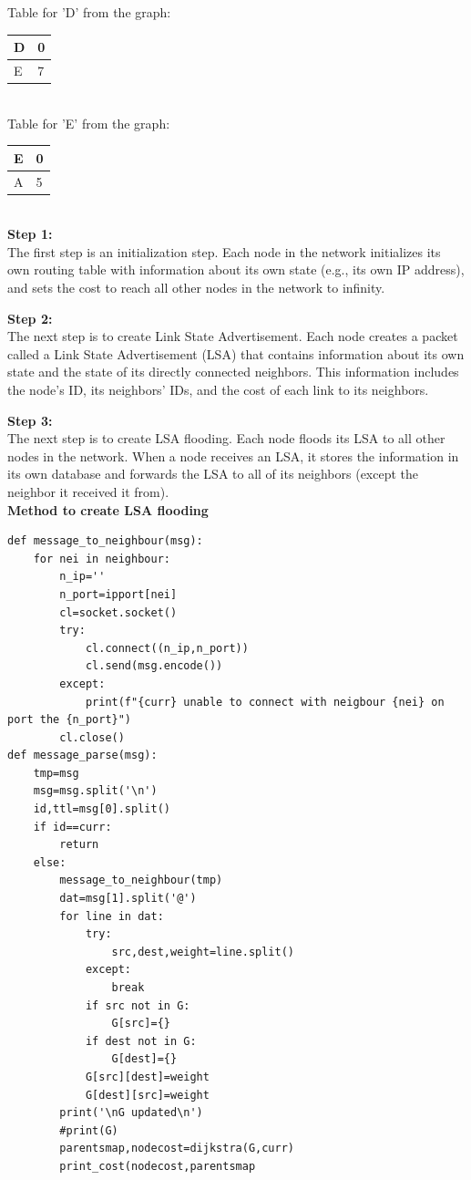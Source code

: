 \documentclass[11pt]{article}
\begin{document}
Table for 'D' from the graph:\\[12pt] 
\begin{tabular}{ | m{8em} | m{5cm}| } 
  \hline
   D & 0\\ 
  \hline
  E & 7\\ 
  \hline
\end{tabular}\\[24pt]


Table for 'E' from the graph:\\[12pt] 
\begin{tabular}{ | m{8em} | m{5cm}| } 
  \hline
   E & 0\\ 
  \hline
  A & 5\\ 
  \hline
\end{tabular}\\[24pt]

\textbf{Step 1: }\\[12pt]
The first step is an initialization step. Each node in the network initializes its own routing table with information about its own state (e.g., its own IP address), and sets the cost to reach all other nodes in the network to infinity.


\textbf{Step 2: }\\[12pt]
The next step is to create Link State Advertisement. Each node creates a packet called a Link State Advertisement (LSA) that contains information about its own state and the state of its directly connected neighbors. This information includes the node's ID, its neighbors' IDs, and the cost of each link to its neighbors.

\textbf{Step 3: }\\[12pt]
The next step is to create LSA flooding. Each node floods its LSA to all other nodes in the network. When a node receives an LSA, it stores the information in its own database and forwards the LSA to all of its neighbors (except the neighbor it received it from).\\[12pt]
\textbf{Method to create LSA flooding }\\[12pt]
\begin{verbatim}
def message_to_neighbour(msg):
	for nei in neighbour:
		n_ip=''
		n_port=ipport[nei]
		cl=socket.socket()
		try:
			cl.connect((n_ip,n_port))
			cl.send(msg.encode())
		except:
			print(f"{curr} unable to connect with neigbour {nei} on port the {n_port}")
		cl.close()
def message_parse(msg):
	tmp=msg
	msg=msg.split('\n')
	id,ttl=msg[0].split()
	if id==curr:
		return
	else:
		message_to_neighbour(tmp)
		dat=msg[1].split('@')
		for line in dat:
			try:
				src,dest,weight=line.split()
			except:
				break
			if src not in G:
				G[src]={}
			if dest not in G:
				G[dest]={}
			G[src][dest]=weight
			G[dest][src]=weight
		print('\nG updated\n')
		#print(G)
		parentsmap,nodecost=dijkstra(G,curr)
		print_cost(nodecost,parentsmap
\end{verbatim}
\\[12pt]
\end{document}
